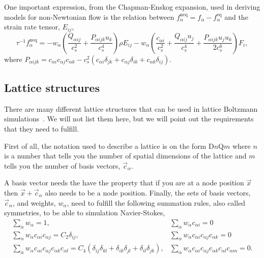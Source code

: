 \documentclass[11pt,a4paper]{report}
\begin{document}
One important expression, from the Chapman-Enskog expansion, used in deriving models for non-Newtonian flow is the relation between $f_\alpha^\mathrm{neq} = f_\alpha-f_\alpha^\mathrm{eq}$ and the strain rate tensor, $E_{ij}$,
\begin{equation}\label{eq:f_neq e_ij}
\tau^{-1}f_\alpha^\mathrm{neq} = -w_\alpha\left(\frac{Q_{\alpha ij}}{c_s^2} + \frac{P_{\alpha ijk}u_k}{c_s^4}\right)\rho E_{ij} -w_\alpha\left(\frac{c_{\alpha i}}{c_s^2} +\frac{Q_{\alpha ij}u_j}{c_s^4} + \frac{P_{\alpha ijk}u_ju_k}{2c_s^6}\right)F_i,
\end{equation}
where $P_{\alpha ijk} = c_{\alpha i}c_{\alpha j}c_{\alpha k} - c_s^2\left(c_{\alpha i}\delta_{jk} + c_{\alpha j}\delta_{ik} + c_{\alpha k}\delta_{ij}\right)$.

\subsection{Lattice structures}
\label{subsec:lattice structures}
There are many different lattice structures that can be used in lattice Boltzmann simulations~\cite{wolf-gladrow_lattice-gas_2004}. We will not list them here, but we will point out the requirements that they need to fulfill. 

First of all, the notation used to describe a lattice is on the form D$n$Q$m$ where $n$ is a number that tells you the number of spatial dimensions of the lattice and $m$ tells you the number of basis vectors, $\vec{c}_\alpha$. 

A basis vector needs the have the property that if you are at a node position $\vec{x}$ then $\vec{x} + \vec{c}_\alpha$ also needs to be a node position. Finally, the sets of basis vectors, $\vec{c}_\alpha$, and weights, $w_\alpha$, need to fulfill the following summation rules, also called symmetries, to be able to simulation Navier-Stokes, 
\begin{equation}
\begin{array}{ll}
	\sum_\alpha w_\alpha = 1, & \sum_\alpha w_\alpha c_{\alpha i} = 0 \\ 
	\sum_\alpha w_\alpha c_{\alpha i}c_{\alpha j} = C_2\delta_{ij}, & \sum_\alpha w_\alpha c_{\alpha i}c_{\alpha j}c_{\alpha k} = 0 \\ 
	\sum_\alpha w_\alpha c_{\alpha i}c_{\alpha j}c_{\alpha k}c_{\alpha l} = C_4\left(\delta_{ij}\delta_{kl} + \delta_{ik}\delta_{jl}+ \delta_{il}\delta_{jk}\right), & \sum_\alpha w_\alpha c_{\alpha i}c_{\alpha j}c_{\alpha k}c_{\alpha l}c_{\alpha m} = 0.
\end{array} 
\end{equation}
\end{document}
